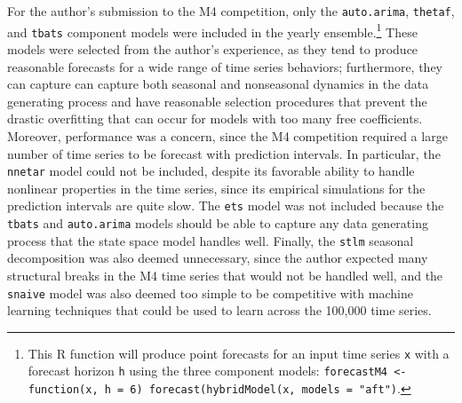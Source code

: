 \documentclass[11pt,3p,review,authoryear]{elsarticle}
\begin{document}
For the author's submission to the M4 competition, only the \texttt{auto.arima}, \texttt{thetaf}, and \texttt{tbats} component models were included in the yearly ensemble.\footnote{This R function will produce point forecasts for an input time series \texttt{x} with a forecast horizon \texttt{h} using the three component models: \texttt{forecastM4 <- function(x, h = 6) forecast(hybridModel(x, models = "aft")}.} These models were selected from the author's experience, as they tend to produce reasonable forecasts for a wide range of time series behaviors; furthermore, they can capture can capture both seasonal and nonseasonal dynamics in the data generating process and have reasonable selection procedures that prevent the drastic overfitting that can occur for models with too many free coefficients. Moreover, performance was a concern, since the M4 competition required a large number of time series to be forecast with prediction intervals. In particular, the \texttt{nnetar} model could not be included, despite its favorable ability to handle nonlinear properties in the time series, since its empirical simulations for the prediction intervals are quite slow. The \texttt{ets} model was not included because the \texttt{tbats} and \texttt{auto.arima} models should be able to capture any data generating process that the state space model handles well. Finally, the \texttt{stlm} seasonal decomposition was also deemed unnecessary, since the author expected many structural breaks in the M4 time series that would not be handled well, and the \texttt{snaive} model was also deemed too simple to be competitive with machine learning techniques that could be used to learn across the 100,000 time series.
\end{document}
